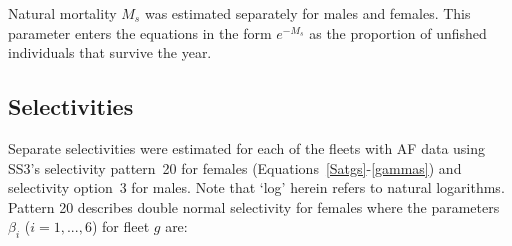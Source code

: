 \documentclass[11pt]{book}
\begin{document}
Natural mortality $M_s$ was estimated separately for males and females.
This parameter enters the equations in the form $e^{-M_s}$ as the proportion of unfished individuals that survive the year.

\subsection{Selectivities} \label{ss:select}

Separate selectivities were estimated for each of the fleets with AF data using SS3's selectivity pattern~20 for females (Equations~\ref{Satgs}-\ref{gammas}) and selectivity option~3 for males.
Note that `log' herein refers to natural logarithms. %
Pattern 20 describes double normal selectivity for females where the parameters $\beta_i$ ($i=1,...,6$) for fleet $g$ are:
\end{document}

